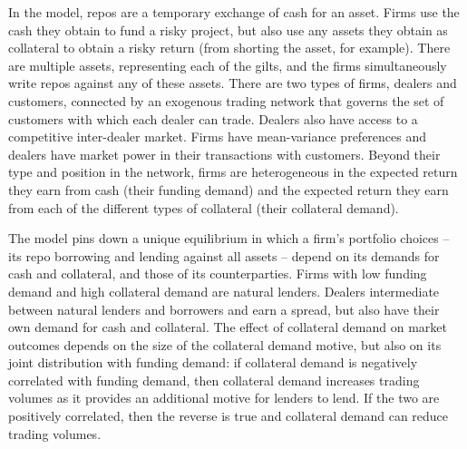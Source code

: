 In the model, repos are a temporary exchange of cash for an asset. Firms use the cash they obtain to fund a risky project, but also use any assets they obtain as collateral to obtain a risky return (from shorting the asset, for example). There are multiple assets, representing each of the gilts, and the firms simultaneously write repos against any of these assets. There are two types of firms, dealers and customers, connected by an exogenous trading network that governs the set of customers with which each dealer can trade. Dealers also have access to a competitive inter-dealer market. Firms have mean-variance preferences and dealers have market power in their transactions with customers. Beyond their type and position in the network, firms are heterogeneous in the expected return they earn from cash (their funding demand) and the expected return they earn from each of the different types of collateral (their collateral demand). 



The model pins down a unique equilibrium in which a firm's portfolio choices -- its repo borrowing and lending against all assets -- depend on its demands for cash and collateral, and those of its counterparties. Firms with low funding demand and high collateral demand are natural lenders. Dealers intermediate between natural lenders and borrowers and earn a spread, but also have their own demand for cash and collateral. The effect of collateral demand on market outcomes depends on the size of the collateral demand motive, but also on its joint distribution with funding demand: if collateral demand is negatively correlated with funding demand, then collateral demand increases trading volumes as it provides an additional motive for lenders to lend. If the two are positively correlated, then the reverse is true and collateral demand can reduce trading volumes.

